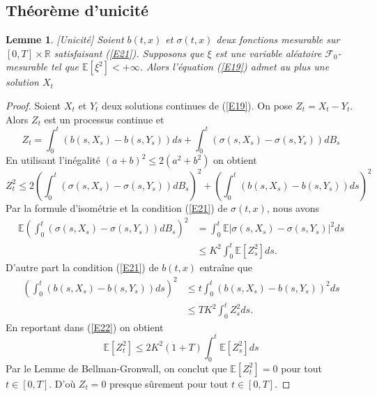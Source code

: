 \documentclass[A4paper,12pt]{report}
\newtheorem{lemma}{Lemme}[chapter]
\newcommand{\E}{{\mathbb{E}}}
\begin{document}
\subsection{Théorème d'unicité}
\begin{lemma}\label{lem8}[Unicité] Soient $b(t, x)$ et $\sigma(t, x)$ deux fonctions mesurable sur $[0, T] \times \mathbb{R}$ satisfaisant (\ref{E21}). Supposons que $\xi$ est une variable aléatoire $\mathcal{F}_{0}$-mesurable tel que $\E\left[\xi^{2}\right]<+\infty$. Alors l'équation (\ref{E19}) admet au plus une solution $X_{t}$
\end{lemma}
\begin{proof}
Soient $X_{t}$ et $Y_{t}$ deux solutions continues de (\ref{E19}). On pose $Z_{t}=X_{t}-Y_{t}$. Alors $Z_{t}$ est un processus continue et
$$Z_{t}=\int_{0}^{t}\left(b\left(s, X_{s}\right)-b\left(s, Y_{s}\right)\right) d s+\int_{0}^{t}\left(\sigma\left(s, X_{s}\right)-\sigma\left(s, Y_{s}\right)\right) d B_{s}$$
En utilisant l'inégalité $(a+b)^{2} \leq 2\left(a^{2}+b^{2}\right)$ on obtient
\begin{equation}\label{E22}
Z_{t}^{2} \leq 2\left(\int_{0}^{t}\left(\sigma\left(s, X_{s}\right)-\sigma\left(s, Y_{s}\right)\right) d B_{s}\right)^{2}+\left(\int_{0}^{t}\left(b\left(s, X_{s}\right)-b\left(s, Y_{s}\right)\right) d s\right)^{2}
\end{equation}
Par la formule d'isométrie et la condition (\ref{E21}) de $\sigma(t, x)$, nous avons
$$
\begin{aligned}
\E\left(\int_{0}^{t}\left(\sigma\left(s, X_{s}\right)-\sigma\left(s, Y_{s}\right)\right) d B_{s}\right)^{2} & =\int_{0}^{t} \E\left|\sigma\left(s, X_{s}\right)-\sigma\left(s, Y_{s}\right)\right|^{2} d s \\
& \leq K^{2} \int_{0}^{t} \E\left[Z_{s}^{2}\right] d s .
\end{aligned}
$$
D'autre part la condition (\ref{E21}) de $b(t, x)$ entraîne que
$$
\begin{aligned}
\left(\int_{0}^{t}\left(b\left(s, X_{s}\right)-b\left(s, Y_{s}\right)\right) d s\right)^{2} & \leq t \int_{0}^{t}\left(b\left(s, X_{s}\right)-b\left(s, Y_{s}\right)\right)^{2} d s \\
& \leq T K^{2} \int_{0}^{t} Z_{s}^{2} d s .
\end{aligned}$$
En reportant dans (\ref{E22}) on obtient
$$\E\left[Z_{t}^{2}\right] \leq 2 K^{2}(1+T) \int_{0}^{t} \E\left[Z_{s}^{2}\right] d s $$
Par le Lemme de Bellman-Gronwall, on conclut que $\E\left[Z_{t}^{2}\right]=0$ pour tout $t \in[0, T]$. D'où $Z_{t}=0$ presque sûrement pour tout $t \in[0, T]$.
\end{proof}
\end{document}
